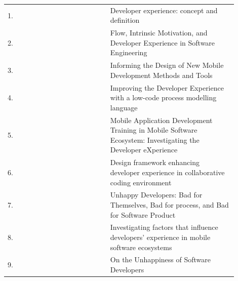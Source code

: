 \documentclass[english, 12pt, a4paper, sci, utf8, a-1b, online]{aaltothesis}
\begin{document}
\begin{center}
  \begin{longtable}{p{0.05\linewidth}p{0.35\linewidth}p{0.5\linewidth}}
    \label{table:scientific-articles}                                                                                                                                                                         \\
    1.  & \textcite{fagerholm-dx-concept-and-definition}        & Developer experience: concept and definition                                                                                                \\
    2.  & \textcite{flow-intrinsic-dx}                          & Flow, Intrinsic Motivation, and Developer Experience in Software Engineering                                                                \\
    3.  & \textcite{nebeling2013informing}                      & Informing the Design of New Mobile Development Methods and Tools                                                                            \\
    4.  & \textcite{henriques2018improving}                     & Improving the Developer Experience with a low-code process modelling language                                                               \\
    5.  & \textcite{fontao2018mobile}                           & Mobile Application Development Training in Mobile Software Ecosystem: Investigating the Developer eXperience                                \\
    6.  & \textcite{design-framework-enhancing}                & Design framework enhancing developer experience in collaborative coding environment                                                         \\
    7.  & \textcite{unhappy-developers}                         & Unhappy Developers: Bad for Themselves, Bad for process, and Bad for Software Product                                                       \\
    8.  & \textcite{fontao2017investigating}                    & Investigating factors that influence developers' experience in mobile software ecosystems                                                   \\
    9.  & \textcite{on-the-unhappiness}                         & On the Unhappiness of Software Developers                                                                                                   \\

\end{longtable}
\end{center}
\end{document}
